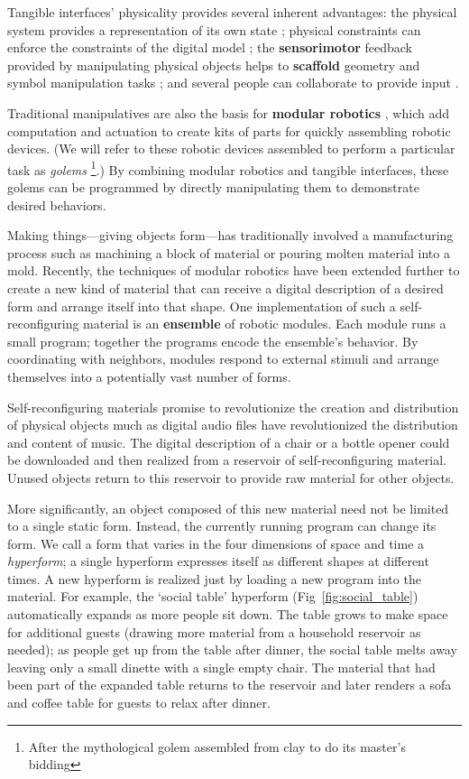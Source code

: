 Tangible interfaces' physicality provides several inherent advantages: the physical system provides a representation of its own state \citep{jacob_chi2008}; physical constraints can enforce the constraints of the digital model \citep{patten_chi2007}; the \textbf{sensorimotor} feedback provided by manipulating physical objects helps to \textbf{scaffold} geometry and symbol manipulation tasks \citep{nesta_tangible_learning}; and several people can collaborate to provide input \citep{handsaw,algoblock}.

Traditional manipulatives are also the basis for \textbf{modular robotics} \citep{yim_ra2007}, which add computation and actuation to create kits of parts for quickly assembling robotic devices. 
(We will refer to these robotic devices assembled to perform a particular task as \emph{golems}%
\footnote{After the mythological golem assembled from clay to do its master's bidding}.) 
By combining modular robotics and tangible interfaces, these golems can be programmed by directly manipulating them to demonstrate desired behaviors.

Making things---giving objects form---has traditionally involved a manufacturing process such as machining a block of material or pouring molten material into a mold. 
Recently, the techniques of modular robotics have been extended further to create a new kind of material that can receive a digital description of a desired form and arrange itself into that shape. 
One implementation of such a self{}-reconfiguring material is an \textbf{ensemble} of robotic modules. 
Each module runs a small program; together the programs encode the ensemble's behavior. 
By coordinating with neighbors, modules respond to external stimuli and arrange themselves into a potentially vast number of forms.

Self{}-reconfiguring materials promise to revolutionize the creation and distribution of physical objects much as digital audio files have revolutionized the distribution and content of music. 
The digital description of a chair or a bottle opener could be downloaded and then realized from a reservoir of self{}-reconfiguring material. 
Unused objects return to this reservoir to provide raw material for other objects.

More significantly, an object composed of this new material need not be limited to a single static form. 
Instead, the currently running program can change its form. 
We call a form that varies in the four dimensions of space and time a \emph{hyperform}; a single hyperform expresses itself as different shapes at different times.  
A new hyperform is realized just by loading a new program into the material. 
For example, the `social table' hyperform (Fig~\ref{fig:social_table}) automatically expands as more people sit down. 
The table grows to make space for additional guests (drawing more material from a household reservoir as needed); as people get up from the table after dinner, the social table melts away leaving only a small dinette with a single empty chair. 
The material that had been part of the expanded table returns to the reservoir and later renders a sofa and coffee table for guests to relax after dinner.

